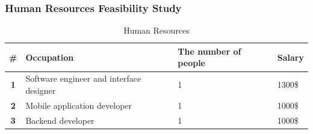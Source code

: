 \documentclass[12pt]{article}
\begin{document}
			\subsubsection{Human Resources Feasibility Study }
		\begin{table}[!h]
			\centering
			\caption{Human Resources}
			\begin{tabular}{|c|p{3.4cm}|l|l|}
				\hline
				\rowcolor{lightgray}
				\# & \textbf{Occupation} & \textbf{The number of people} & \textbf{Salary} \\
				\hline
				\cellcolor{lightgray}\textbf{1} & Software engineer and interface designer & 1 & 1300\$\\
				\hline
				\cellcolor{lightgray}\textbf{2} & Mobile application developer & 1 & 1000\$ \\
				\hline
				\cellcolor{lightgray}\textbf{3} &  Backend developer & 1 & 1000\$ \\
				\hline
			\end{tabular}
		\end{table}
			
		\begin{center}
			\newpage
		\end{center}
\end{document}
